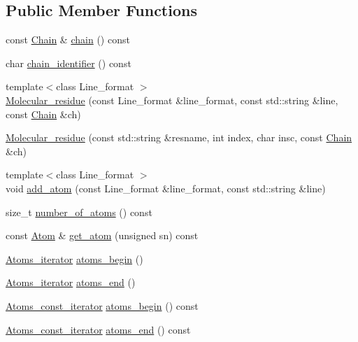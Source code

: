 \subsection*{Public Member Functions}
\begin{DoxyCompactItemize}
\item 
const \hyperlink{classESBTL_1_1Molecular__residue_a3e18b15e0505f8b1c0d0bf200091698d}{Chain} \& \hyperlink{classESBTL_1_1Molecular__residue_a627d6da21b3d9335a058994c4be06a46}{chain} () const
\item 
char \hyperlink{classESBTL_1_1Molecular__residue_ae9fae8a6f3bc67c676164a5d16e293bd}{chain\+\_\+identifier} () const
\item 
{\footnotesize template$<$class Line\+\_\+format $>$ }\\\hyperlink{classESBTL_1_1Molecular__residue_a52fbfe2fe506efeba9d741f133f572f3}{Molecular\+\_\+residue} (const Line\+\_\+format \&line\+\_\+format, const std\+::string \&line, const \hyperlink{classESBTL_1_1Molecular__residue_a3e18b15e0505f8b1c0d0bf200091698d}{Chain} \&ch)
\item 
\hyperlink{classESBTL_1_1Molecular__residue_ad143d9d22cee3ea6eff0a8d58da4e270}{Molecular\+\_\+residue} (const std\+::string \&resname, int index, char insc, const \hyperlink{classESBTL_1_1Molecular__residue_a3e18b15e0505f8b1c0d0bf200091698d}{Chain} \&ch)
\item 
{\footnotesize template$<$class Line\+\_\+format $>$ }\\void \hyperlink{classESBTL_1_1Molecular__residue_a7414ddf8808e300c93f38c0f45bcca09}{add\+\_\+atom} (const Line\+\_\+format \&line\+\_\+format, const std\+::string \&line)
\item 
size\+\_\+t \hyperlink{classESBTL_1_1Molecular__residue_a98e2ece965924adef88f8509bd77177c}{number\+\_\+of\+\_\+atoms} () const
\item 
const \hyperlink{classESBTL_1_1Molecular__residue_ac48ca38f130266b0403df294bff016ae}{Atom} \& \hyperlink{classESBTL_1_1Molecular__residue_afea9ebf25f3f5544871a23ec42eba36d}{get\+\_\+atom} (unsigned sn) const
\item 
\hyperlink{group__grp__iters_ga4f220ea2d647f555b579a7ab2831baa7}{Atoms\+\_\+iterator} \hyperlink{group__grp__iters_ga1a03ace7902e971ae8a0d82eddf237c6}{atoms\+\_\+begin} ()
\item 
\hyperlink{group__grp__iters_ga4f220ea2d647f555b579a7ab2831baa7}{Atoms\+\_\+iterator} \hyperlink{group__grp__iters_ga628b784affe52d58322c5f405b454def}{atoms\+\_\+end} ()
\item 
\hyperlink{group__grp__iters_gab312d7a420670665b99a379b51825c9c}{Atoms\+\_\+const\+\_\+iterator} \hyperlink{group__grp__iters_ga1d1092e0acc1e4a6ee07b03a78af8e1c}{atoms\+\_\+begin} () const
\item 
\hyperlink{group__grp__iters_gab312d7a420670665b99a379b51825c9c}{Atoms\+\_\+const\+\_\+iterator} \hyperlink{group__grp__iters_ga27d17ddd3a3c208e95464afb2e466459}{atoms\+\_\+end} () const
\end{DoxyCompactItemize}
